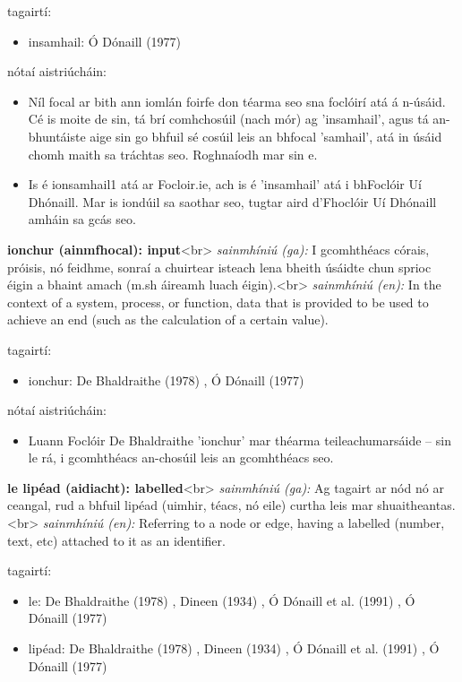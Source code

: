\documentclass{article}
\begin{document}
tagairtí:
\begin{itemize}
	\item insamhail: Ó Dónaill (1977) \cite{odonaill}
\end{itemize}

nótaí aistriúcháin:
\begin{itemize}
	\item Níl focal ar bith ann iomlán foirfe don téarma seo sna foclóirí atá á n-úsáid. Cé is moite de sin, tá brí comhchosúil (nach mór) ag 'insamhail', agus tá an-bhuntáiste aige sin go bhfuil sé cosúil leis an bhfocal 'samhail', atá in úsáid chomh maith sa tráchtas seo. Roghnaíodh mar sin e.
	\item Is é ionsamhail1 atá ar Focloir.ie, ach is é 'insamhail' atá i bhFoclóir Uí Dhónaill. Mar is iondúil sa saothar seo, tugtar aird d'Fhoclóir Uí Dhónaill amháin sa gcás seo.
\end{itemize}


\textbf{ionchur (ainmfhocal): input}<br>
\textit{sainmhíniú (ga):} I gcomhthéacs córais, próisis, nó feidhme, sonraí a chuirtear isteach lena bheith úsáidte chun sprioc éigin a bhaint amach (m.sh áireamh luach éigin).<br>
\textit{sainmhíniú (en):} In the context of a system, process, or function, data that is provided to be used to achieve an end (such as the calculation of a certain value).

tagairtí:
\begin{itemize}
	\item ionchur: De Bhaldraithe (1978) \cite{de-bhaldraithe}, Ó Dónaill (1977) \cite{odonaill}
\end{itemize}

nótaí aistriúcháin:
\begin{itemize}
	\item Luann Foclóir De Bhaldraithe 'ionchur' mar théarma teileachumarsáide -- sin le rá, i gcomhthéacs an-chosúil leis an gcomhthéacs seo.
\end{itemize}


\textbf{le lipéad (aidiacht): labelled}<br>
\textit{sainmhíniú (ga):} Ag tagairt ar nód nó ar ceangal, rud a bhfuil lipéad (uimhir, téacs, nó eile) curtha leis mar shuaitheantas.<br>
\textit{sainmhíniú (en):} Referring to a node or edge, having a labelled (number, text, etc) attached to it as an identifier.

tagairtí:
\begin{itemize}
	\item le: De Bhaldraithe (1978) \cite{de-bhaldraithe}, Dineen (1934) \cite{dineen}, Ó Dónaill et al. (1991) \cite{focloir-beag}, Ó Dónaill (1977) \cite{odonaill}
	\item lipéad: De Bhaldraithe (1978) \cite{de-bhaldraithe}, Dineen (1934) \cite{dineen}, Ó Dónaill et al. (1991) \cite{focloir-beag}, Ó Dónaill (1977) \cite{odonaill}
\end{itemize}
\end{document}
